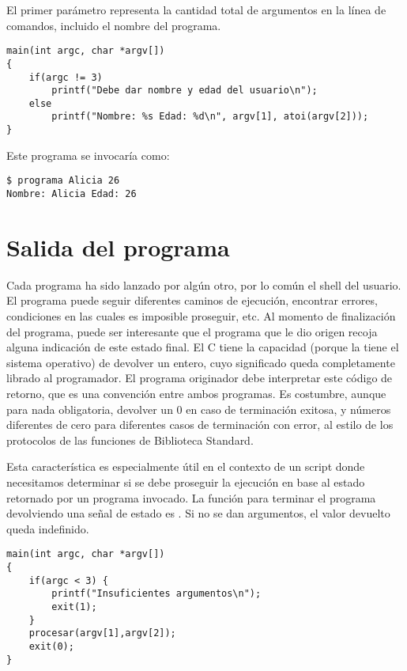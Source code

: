 \begin{ejemplo}
El primer parámetro representa la cantidad total de argumentos en la
      línea de comandos, incluido el nombre del programa.

\begin{lstlisting}
main(int argc, char *argv[])
{
    if(argc != 3)
        printf("Debe dar nombre y edad del usuario\n");
    else
        printf("Nombre: %s Edad: %d\n", argv[1], atoi(argv[2]));
}	
\end{lstlisting}

Este programa se invocaría como:
\begin{lstlisting}
$ programa Alicia 26
Nombre: Alicia Edad: 26
\end{lstlisting}
\end{ejemplo}

\section{Salida del programa}
Cada programa ha sido lanzado por algún otro, por lo común el shell del
usuario. El programa puede seguir diferentes caminos de ejecución, encontrar
errores, condiciones en las cuales es imposible proseguir, etc. Al momento de
finalización del programa, puede ser interesante que el programa que le dio
origen recoja alguna indicación de este estado final. El C tiene la capacidad
(porque la tiene el sistema operativo) de devolver un entero, cuyo significado
queda completamente librado al programador. El programa originador debe
interpretar este código de retorno, que es una convención entre ambos
programas. Es costumbre, aunque para nada obligatoria, devolver un 0 en caso de
terminación exitosa, y números diferentes de cero para diferentes casos de
terminación con error, al estilo de los protocolos de las funciones de
Biblioteca Standard.

Esta característica es especialmente útil en el contexto de un script donde
necesitamos determinar si se debe proseguir la ejecución en base al estado
retornado por un programa invocado.
La función para terminar el programa devolviendo una señal de estado es .
Si no se dan argumentos, el valor devuelto queda indefinido.


\begin{ejemplo}
\begin{lstlisting}
main(int argc, char *argv[])
{
    if(argc < 3) {
        printf("Insuficientes argumentos\n");
        exit(1);
    }
    procesar(argv[1],argv[2]);
    exit(0);
}
\end{lstlisting}
\end{ejemplo}

